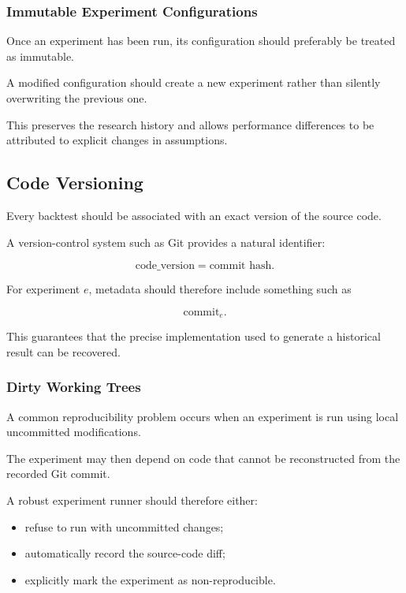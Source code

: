 \documentclass[11pt,a4paper]{article}
\begin{document}
\subsubsection{Immutable Experiment Configurations}

Once an experiment has been run, its configuration should preferably be treated
as immutable.

A modified configuration should create a new experiment rather than silently
overwriting the previous one.

This preserves the research history and allows performance differences to be
attributed to explicit changes in assumptions.


\subsection{Code Versioning}
\label{subsec:code_versioning}

Every backtest should be associated with an exact version of the source code.

A version-control system such as Git provides a natural identifier:

\begin{equation}
\boxed{
\text{code\_version}
=
\text{commit hash}.
}
\end{equation}

For experiment $e$, metadata should therefore include something such as

\begin{equation}
\boxed{
\mathrm{commit}_e.
}
\end{equation}

This guarantees that the precise implementation used to generate a historical
result can be recovered.


\subsubsection{Dirty Working Trees}

A common reproducibility problem occurs when an experiment is run using local
uncommitted modifications.

The experiment may then depend on code that cannot be reconstructed from the
recorded Git commit.

A robust experiment runner should therefore either:

\begin{itemize}
    \item refuse to run with uncommitted changes;
    \item automatically record the source-code diff;
    \item explicitly mark the experiment as non-reproducible.
\end{itemize}
\end{document}
